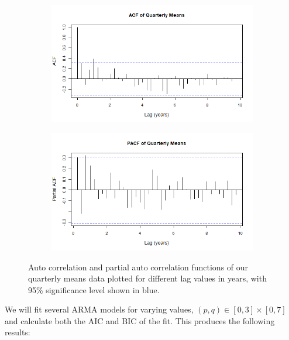 \begin{figure}[H]
    \centering
    \begin{subfigure}[b]{\sOneSize\textwidth}
        \centering
        \includegraphics[width=\textwidth]{Sections/ARIMA/Plots/ACF.png}
        \label{S2fig:ACF}
    \end{subfigure}
    \begin{subfigure}[b]{\sOneSize\textwidth}
        \centering
        \includegraphics[width=\textwidth]{Sections/ARIMA/Plots/PACF.png}
        \label{S2fig:PACF}
    \end{subfigure}
\caption{Auto correlation and partial auto correlation functions of our quarterly means data plotted for different lag values in years, with 95\% significance level shown in blue.}
\label{S2fig:ACFPACF}
\end{figure}

We will fit several ARMA models for varying values, $(p,q) \in [0,3]\times[0,7]$ and calculate both the AIC and BIC of the fit. This produces the following results:

